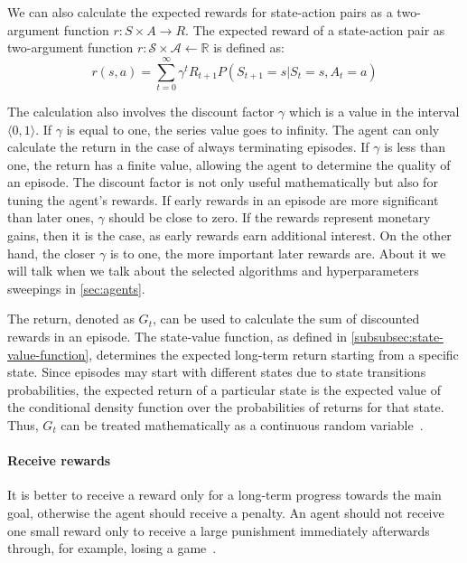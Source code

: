 \documentclass[../xlapes02]{subfiles}
\begin{document}
    We can also calculate the expected rewards for state-action pairs as a two-argument function $r: S \times A \to R$.
    The expected reward of a state-action pair as two-argument function $r: \mathcal{S}\times \mathcal{A}\leftarrow \mathbb{R}$ is defined as:
    \begin{equation}
        r(s, a) = \sum_{t=0}^{\infty} \gamma^t R_{t+1} P(S_{t+1} = s|S_t = s, A_t = a)
    \end{equation}

    The calculation also involves the discount factor $\gamma$ which is a value in the interval $\langle 0, 1 \rangle$. If $\gamma$ is equal to one, the series value goes to infinity. The agent can only calculate the return in the case of always terminating episodes. If $\gamma$ is less than one, the return has a finite value, allowing the agent to determine the quality of an episode. The discount factor is not only useful mathematically but also for tuning the agent's rewards. If early rewards in an episode are more significant than later ones, $\gamma$ should be close to zero. If the rewards represent monetary gains, then it is the case, as early rewards earn additional interest. On the other hand, the closer $\gamma$ is to one, the more important later rewards are. About it we will talk when we talk about the selected algorithms and hyperparameters sweepings in \cref{sec:agents}.

    The return, denoted as $G_t$, can be used to calculate the sum of discounted rewards in an episode. The state-value function, as defined in \cref{subsubsec:state-value-function}, determines the expected long-term return starting from a specific state. Since episodes may start with different states due to state transitions probabilities, the expected return of a particular state is the expected value of the conditional density function over the probabilities of returns for that state. Thus, $G_t$ can be treated mathematically as a continuous random variable~\cite{FITMT25127}.

    \paragraph{Receive rewards}
    It is better to receive a reward only for a long-term progress towards the main goal, otherwise the agent should receive a penalty. An agent should not receive one small reward only to receive a large punishment immediately afterwards through, for example, losing a game~\cite{sutton2018reinforcement}.
\end{document}
